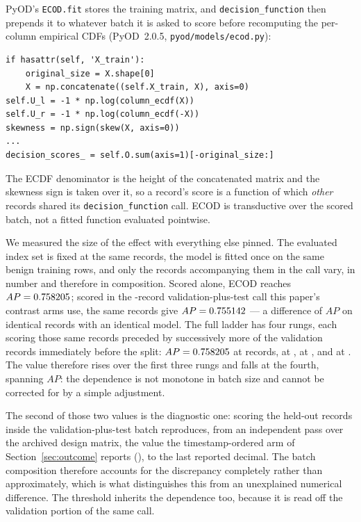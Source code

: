 \documentclass[manuscript,anonymous,review]{acmart}
\begin{document}
\noindent\begin{minipage}{\linewidth}
PyOD's \texttt{ECOD.fit} stores the training matrix, and
\texttt{decision\_function} then prepends it to whatever batch it is asked to
score before recomputing the per-column empirical CDFs
(PyOD~2.0.5, \texttt{pyod/models/ecod.py}):
\begin{verbatim}
if hasattr(self, 'X_train'):
    original_size = X.shape[0]
    X = np.concatenate((self.X_train, X), axis=0)
self.U_l = -1 * np.log(column_ecdf(X))
self.U_r = -1 * np.log(column_ecdf(-X))
skewness = np.sign(skew(X, axis=0))
...
decision_scores_ = self.O.sum(axis=1)[-original_size:]
\end{verbatim}
\end{minipage}\par\medskip

The ECDF denominator is the height of the concatenated matrix and the skewness
sign is taken over it, so a record's score is a function of which \emph{other}
records shared its \texttt{decision\_function} call. ECOD is transductive over
the scored batch, not a fitted function evaluated pointwise.

We measured the size of the effect with everything else pinned. The evaluated
index set is fixed at the same \RevEcodBatchEvalRecords{} records, the model is
fitted once on the same benign training rows, and only the records
accompanying them in the call vary, in number and therefore in composition. Scored alone, ECOD reaches
$AP=0.758205$; scored in the
\CicidsEcodScoringBatch-record validation-plus-test call this paper's contrast
arms use, the same records give
$AP=0.755142$ --- a difference of
\RevEcodBatchDelta{} $AP$ on identical records with an identical model. The
full ladder has four rungs, each scoring those same
\RevEcodBatchEvalRecords{} records preceded by successively more of the
validation records immediately before the split:
$AP=0.758205$ at
\RevEcodBatchEvalRecords{} records,
\RevEcodBatchThreeZeroZeroZeroZeroZeroAucpr{} at \RevEcodBatchLadderOne,
\RevEcodBatchThreeSixZeroZeroZeroZeroAucpr{} at \RevEcodBatchLadderTwo, and
\RevEcodBatchFourEightZeroZeroZeroZeroAucpr{} at \CicidsEcodScoringBatch. The
value therefore rises over the first three rungs and falls at the fourth,
spanning \RevEcodBatchSpread{} $AP$: the dependence is not monotone in batch
size and cannot be corrected for by a simple adjustment.

The second of those two values is the diagnostic one: scoring the held-out
records inside the validation-plus-test batch reproduces, from an independent
pass over the archived design matrix, the value the timestamp-ordered arm of
Section~\ref{sec:outcome} reports (\SFourCicidsNaturalEcodAucpr), to the last
reported decimal. The batch composition therefore accounts for the discrepancy
completely rather than approximately, which is what distinguishes this from an
unexplained numerical difference. The threshold inherits the dependence too, because it is read off
the validation portion of the same call.
\end{document}
